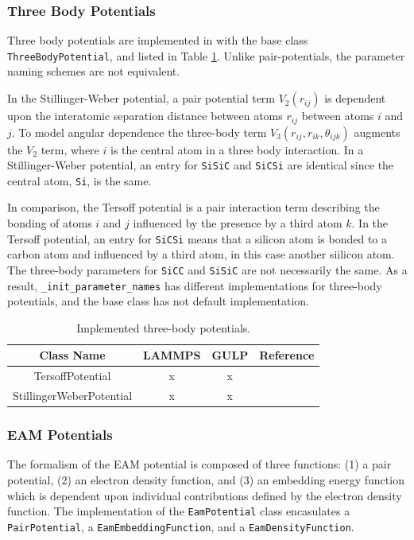 \subsubsection{Three Body Potentials}
Three body potentials are implemented in with the base class \verb|ThreeBodyPotential|, and listed in Table \ref{tbl:pypospack_threebody_potentials}.  Unlike pair-potentials, the parameter naming schemes are not equivalent.

In the Stillinger-Weber potential\cite{stillinger1985_sw}, a pair potential term $V_2(r_{ij})$ is dependent upon the interatomic separation distance between atoms $r_{ij}$ between atoms $i$ and $j$.
To model angular dependence the three-body term $V_3(r_{ij},r_{ik},\theta_{ijk})$ augments the $V_2$ term, where $i$ is the central atom in a three body interaction.  In a Stillinger-Weber potential, an entry for \verb|SiSiC| and \verb|SiCSi| are identical since the central atom, \verb|Si|, is the same.

In comparison, the Tersoff potential\cite{tersoff1988_tersoff} is a pair interaction term describing the bonding of atoms $i$ and $j$ influenced by the presence by a third atom $k$.
In the Tersoff potential, an entry for \verb|SiCSi| means that a silicon atom is bonded to a carbon atom and influenced by a third atom, in this case another siilicon atom.  The three-body parameters for \verb|SiCC| and \verb|SiSiC| are not necessarily the same.  As a result, \verb|_init_parameter_names| has different implementations for three-body potentials, and the base class has not default implementation.

\begin{table}[ht]
	\centering
	\caption{Implemented three-body potentials.}
	\label{tbl:pypospack_threebody_potentials}
	\begin{tabular}{cccc}
		\hline
		{Class Name} & LAMMPS & GULP & Reference \\
		\hline
		TersoffPotential & x & x & \cite{tersoff1988_tersoff} \\
		StillingerWeberPotential & x & x &\cite{stillinger1985_sw} \\
		\hline
	\end{tabular}
\end{table}

\subsubsection{EAM Potentials}

The formalism of the EAM potential is composed of three functions: (1) a pair potential, (2) an electron density function, and (3) an embedding energy function which is dependent upon individual contributions defined by the electron density function.
The implementation of the \verb|EamPotential| class encasulates a \verb|PairPotential|, a \verb|EamEmbeddingFunction|, and a \verb|EamDensityFunction|.

